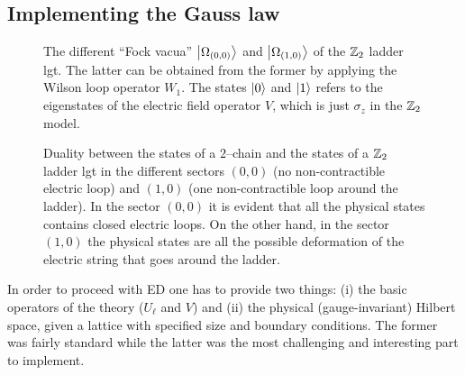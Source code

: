 %
%

\subsection{Implementing the Gauss law}%
\label{sub:implementing_the_gauss_law}

\begin{figure}[t]
    \centering
    
    \caption{The different ``Fock vacua'' $\ket{\Omega_{(0,0)}}$ and $\ket{\Omega_{(1,0)}}$ of the $\mathbb{Z}_2$ ladder \ac{lgt}.
        The latter can be obtained from the former by applying the Wilson loop operator $W_1$.
        The states $\ket{0}$ and $\ket{1}$ refers to the eigenstates of the electric field operator $V$, which is just $\sigma_{z}$ in the $\mathbb{Z}_2$ model.
    }
    \label{fig:z2_vacua}
\end{figure}

\begin{figure*}
    \centering
    
    \caption{Duality between the states of a $2$--chain and the states of a $\mathbb{Z}_2$ ladder \ac{lgt} in the different sectors $(0,0)$ (no non-contractible electric loop) and $(1,0)$ (one non-contractible loop around the ladder).
        In the sector $(0,0)$ it is evident that all the physical states contains closed electric loops.
        On the other hand, in the sector $(1,0)$ the physical states are all the possible deformation of the electric string that goes around the ladder.}
    \label{fig:z2_states}
\end{figure*}

In order to proceed with ED one has to provide two things: (i) the basic operators of the theory ($U_{\ell}$ and $V$) and (ii) the physical (gauge-invariant) Hilbert space, given a lattice with specified size and boundary conditions.
The former was fairly standard while the latter was the most challenging and interesting part to implement.

